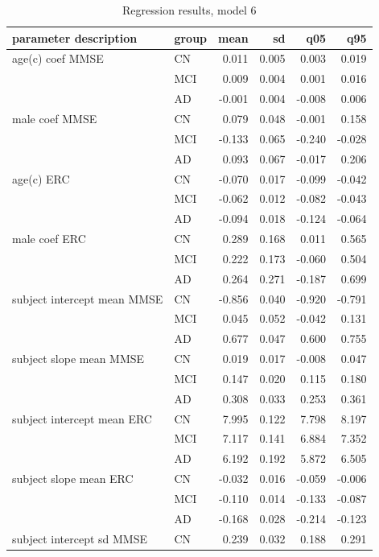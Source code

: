 \documentclass[12pt]{article}
\begin{document}
\pagebreak
\begin{table}[H]
\centering
\caption{Regression results, model 6}
\begin{tabular}{|l|l|r|r|r|r|}
  \hline
  parameter description & group & mean & sd & q05 & q95 \\ 
  \hline
  age(c) coef MMSE & CN & 0.011 & 0.005 & 0.003 & 0.019 \\ 
  & MCI & 0.009 & 0.004 & 0.001 & 0.016 \\ 
  & AD & -0.001 & 0.004 & -0.008 & 0.006 \\ 
  male coef MMSE & CN & 0.079 & 0.048 & -0.001 & 0.158 \\ 
  & MCI & -0.133 & 0.065 & -0.240 & -0.028 \\ 
  & AD & 0.093 & 0.067 & -0.017 & 0.206 \\ 
  age(c) ERC & CN & -0.070 & 0.017 & -0.099 & -0.042 \\ 
  & MCI & -0.062 & 0.012 & -0.082 & -0.043 \\ 
  & AD & -0.094 & 0.018 & -0.124 & -0.064 \\ 
  male coef ERC & CN & 0.289 & 0.168 & 0.011 & 0.565 \\ 
  & MCI & 0.222 & 0.173 & -0.060 & 0.504 \\ 
  & AD & 0.264 & 0.271 & -0.187 & 0.699 \\ 
  subject intercept mean MMSE & CN & -0.856 & 0.040 & -0.920 & -0.791 \\ 
  & MCI & 0.045 & 0.052 & -0.042 & 0.131 \\ 
  & AD & 0.677 & 0.047 & 0.600 & 0.755 \\ 
  subject slope mean MMSE & CN & 0.019 & 0.017 & -0.008 & 0.047 \\ 
  & MCI & 0.147 & 0.020 & 0.115 & 0.180 \\ 
  & AD & 0.308 & 0.033 & 0.253 & 0.361 \\ 
  subject intercept mean ERC & CN & 7.995 & 0.122 & 7.798 & 8.197 \\ 
  & MCI & 7.117 & 0.141 & 6.884 & 7.352 \\ 
  & AD & 6.192 & 0.192 & 5.872 & 6.505 \\ 
  subject slope mean ERC & CN & -0.032 & 0.016 & -0.059 & -0.006 \\ 
  & MCI & -0.110 & 0.014 & -0.133 & -0.087 \\ 
  & AD & -0.168 & 0.028 & -0.214 & -0.123 \\ 
  subject intercept sd MMSE & CN & 0.239 & 0.032 & 0.188 & 0.291 \\ 

\end{tabular}
\end{table}
\end{document}
